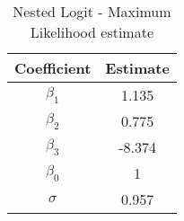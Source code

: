 \begin{table}[h!]
\centering
\caption{Nested Logit - Maximum Likelihood estimate}\label{tab:nestmv}
\begin{tabular}{cc}
 \hline 
Coefficient & Estimate \\ \hline 
$\beta_1$ & 1.135 \\ 
$\beta_2$ & 0.775 \\ 
$\beta_3$ & -8.374 \\ 
$\beta_0$ & 1 \\ 
$\sigma$ & 0.957 \\ 
\hline
\end{tabular}
\end{table}

